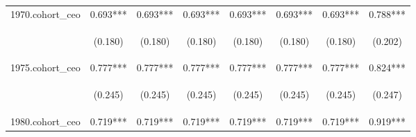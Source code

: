 \begin{center}
\begin{tabular}{lccccccc}
1970.cohort\_ceo & 0.693*** & 0.693*** & 0.693*** & 0.693*** & 0.693*** & 0.693*** & 0.788*** \\
\vspace{4pt} & \begin{footnotesize}(0.180)\end{footnotesize} & \begin{footnotesize}(0.180)\end{footnotesize} & \begin{footnotesize}(0.180)\end{footnotesize} & \begin{footnotesize}(0.180)\end{footnotesize} & \begin{footnotesize}(0.180)\end{footnotesize} & \begin{footnotesize}(0.180)\end{footnotesize} & \begin{footnotesize}(0.202)\end{footnotesize} \\
1975.cohort\_ceo & 0.777*** & 0.777*** & 0.777*** & 0.777*** & 0.777*** & 0.777*** & 0.824*** \\
\vspace{4pt} & \begin{footnotesize}(0.245)\end{footnotesize} & \begin{footnotesize}(0.245)\end{footnotesize} & \begin{footnotesize}(0.245)\end{footnotesize} & \begin{footnotesize}(0.245)\end{footnotesize} & \begin{footnotesize}(0.245)\end{footnotesize} & \begin{footnotesize}(0.245)\end{footnotesize} & \begin{footnotesize}(0.247)\end{footnotesize} \\
1980.cohort\_ceo & 0.719*** & 0.719*** & 0.719*** & 0.719*** & 0.719*** & 0.719*** & 0.919*** \\

\end{tabular}
\end{center}
